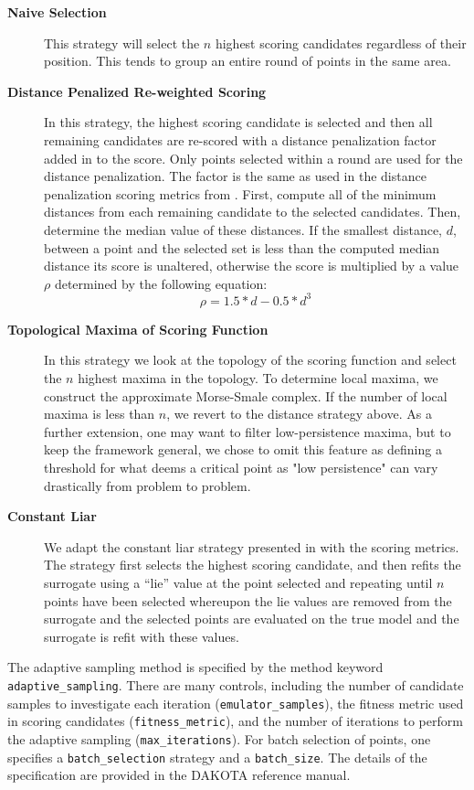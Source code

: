 \begin{description}
\item[\bf Naive Selection]  
This strategy will select the $n$ highest scoring candidates regardless of their
position. This tends to group an entire round of points in the same area.
\item[\bf Distance Penalized Re-weighted Scoring] 
In this strategy, the highest 
scoring candidate is selected and then all
remaining candidates are re-scored with a distance penalization factor added in
to the score.  Only points selected within a round are used for the distance
penalization.  The factor is the same as used in the distance penalization
 scoring metrics from \cite{Maljovec}.  First, compute all of the minimum
distances from each remaining candidate to the selected candidates.  Then,
determine the median value of these distances.  If the smallest distance, $d$,
between a point and the selected set is less than the computed median distance
its score is unaltered, otherwise the score is multiplied by a value $\rho$
determined by the following equation:
\begin{equation}
\rho = 1.5*d - 0.5*d^3
\end{equation}
\item[\bf Topological Maxima of Scoring Function]  
In this strategy we look at the topology of the scoring function and select the
$n$ highest maxima in the topology. To determine local maxima, we construct the
approximate Morse-Smale complex. If the number of local maxima is less than $n$,
 we revert to the distance strategy above.  As a further extension, one may
want to filter low-persistence maxima, but to keep the framework general, we
chose to omit this feature as defining a threshold for what deems a critical
point as "low persistence" can vary drastically from problem to problem.
\item[\bf Constant Liar]  
We adapt the constant liar strategy presented in \cite{Ginsbourger} with the
scoring metrics.  The strategy first selects
the highest scoring candidate, and then refits the surrogate using a ``lie'' value
at the point selected and repeating until $n$ points have been selected
whereupon the lie values are removed from the surrogate and the selected points
are evaluated on the true model and the surrogate is refit with these values.
\end{description}

The adaptive sampling method is specified by the method keyword 
\texttt{adaptive\_sampling}.  There are many controls, including 
the number of candidate samples to investigate each iteration 
(\texttt{emulator\_samples}), the fitness metric used in scoring 
candidates (\texttt{fitness\_metric}), and the number of iterations 
to perform the adaptive sampling (\texttt{max\_iterations}). 
For batch selection of points, one specifies a \texttt{batch\_selection} 
strategy and a \texttt{batch\_size}. 
The details of the specification are provided in the DAKOTA 
reference manual.  

